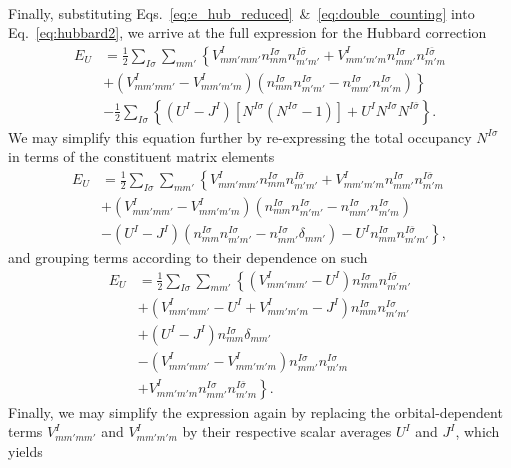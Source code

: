 {\begin{align}
\label{eq:double_counting}
\end{align}
%
Finally, substituting Eqs.~\eqref{eq:e_hub_reduced}~\&~\eqref{eq:double_counting} 
into Eq.~\eqref{eq:hubbard2}, 
we arrive at the full expression 
for the Hubbard correction 
%
\begin{align}
E_U
&=\frac{1}{2}\sum_{I\sigma}\sum_{mm'}\left\{V^I_{mm'mm'}n_{mm}^{I\sigma}n_{m'm'}^{I\bar\sigma}+V^I_{mm'm'm}n_{mm'}^{I\sigma}n_{m'm}^{I\bar\sigma}\right.\nonumber \\[0.5em]
&\left.+(V^I_{mm'mm'}-V^I_{mm'm'm})(n_{mm}^{I\sigma}n_{m'm'}^{I\sigma}-n_{mm'}^{I\sigma}n_{m'm}^{I\sigma})\right\}\nonumber \\[0.5em]
&-\frac{1}{2}\sum_{I\sigma}\left\{(U^I-J^I)\left[N^{I\sigma}(N^{I\sigma}-1)\right]+U^IN^{I\sigma}N^{I\bar\sigma}\right\}.
\end{align}
%
We may simplify this equation further 
by re-expressing the 
total occupancy $N^{I\sigma}$ 
in terms of the constituent matrix elements 
%
\begin{align}
E_U
&=\frac{1}{2}\sum_{I\sigma}\sum_{mm'}\left\{V^I_{mm'mm'}n_{mm}^{I\sigma}n_{m'm'}^{I\bar\sigma}+V^I_{mm'm'm}n_{mm'}^{I\sigma}n_{m'm}^{I\bar\sigma}\right.\nonumber \\[0.5em]
&\left.+(V^I_{mm'mm'}-V^I_{mm'm'm})(n_{mm}^{I\sigma}n_{m'm'}^{I\sigma}-n_{mm'}^{I\sigma}n_{m'm}^{I\sigma})\right.\nonumber \\[0.5em]
&-\left.(U^I-J^I)(n^{I\sigma}_{mm}n^{I\sigma}_{m'm'}-n^{I\sigma}_{mm'}\delta_{mm'})-U^I n^{I\sigma}_{mm}n^{I\bar\sigma}_{m'm'}\right\}, 
\end{align}
%
and grouping terms 
according to their dependence on such 
%
\begin{align}
E_U
&=\frac{1}{2}\sum_{I\sigma}\sum_{mm'}\left\{(V^I_{mm'mm'}-U^I)n_{mm}^{I\sigma}n_{m'm'}^{I\bar\sigma}\right.\nonumber \\[0.5em]
&+\left(V^I_{mm'mm'}-U^I+V^I_{mm'm'm}-J^I\right)n_{mm}^{I\sigma}n_{m'm'}^{I\sigma}\nonumber \\[0.5em]
&+(U^I-J^I)n^{I\sigma}_{mm}\delta_{mm'}\nonumber\\[0.5em]
&-(V^I_{mm'mm'}-V^I_{mm'm'm})n_{mm'}^{I\sigma}n_{m'm}^{I\sigma}\nonumber \\
&+\left.V^I_{mm'm'm}n_{mm'}^{I\sigma}n_{m'm}^{I\bar\sigma}\right\}.
\end{align}
%
Finally, we may simplify the expression again 
by replacing the orbital-dependent terms 
$V^I_{mm'mm'}$ and $V^I_{mm'm'm}$ 
by their respective scalar averages 
$U^I$ and $J^I$, 
which yields
}
